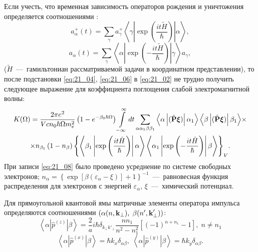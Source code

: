 Если учесть, что временная зависимость операторов рождения и уничтожения определяется соотношениями \cite{Khamidullin2002}:
\begin{equation} \label{eq:21_04}
a_{\alpha}^+ (t) = \sum_{\gamma}{a_{\gamma}^+ \left\langle \gamma \left| \exp{\left( \frac{it\widetilde{H}}{\hbar}\right) } \right| \alpha \right\rangle},
\end{equation}
\begin{equation} \label{eq:21_06}
a_{\alpha} (t) = \sum_{\gamma}{\left\langle \alpha \left| \exp{\left(- \frac{it\widetilde{H}}{\hbar}\right) } \right| \gamma \right\rangle a_{\gamma}},
\end{equation}  
($\widetilde{H}$~---~гамильтониан рассматриваемой задачи в координатном представлении), то после подстановки \eqref{eq:21_04}, \eqref{eq:21_06} в \eqref{eq:21_02} не трудно получить следующее выражение для коэффициента поглощения слабой электромагнитной волны: 
\begin{multline} \label{eq:21_08}
K(\Omega) = \frac{2 \pi e^2 }{V c n_0 \hbar \Omega m_e^2}\left( 1 - e^{-\beta_0 \hbar \Omega} \right) \int\limits_{-\infty }^{\infty} {dt \sum_{\alpha \alpha_1 \beta \beta_1} {\left\langle \alpha \left| (\hat{\boldsymbol{\mathbf{P}}} \boldsymbol{\mathbf{\xi}})  \right| \alpha_1 \right\rangle \left\langle \beta \left| (\hat{\boldsymbol{\mathbf{P}}} \boldsymbol{\mathbf{\xi}})  \right| \beta_1 \right\rangle}} \times\\
\times n_{\beta_1} \left(1-n_{\beta} \right)
{\left\lbrace  \left\langle \beta_1 \left| \exp \left(\frac{it\hat{H}}{\hbar}\right) \right|\alpha\right\rangle \left\langle \alpha_1 \left| \exp \left(-\frac{it\hat{H}}{\hbar}\right) \right|\beta\right\rangle \right\rbrace }_V  .
\end{multline} 
При записи \eqref{eq:21_08} было проведено усреднение по системе свободных электронов; $n_\alpha = \left\{ {\exp\left[ {\beta \left( {\varepsilon _\alpha - \xi } \right)} \right] + 1} \right\}^{ - 1}$~---~равновесная
функция распределения для электронов с энергией $\varepsilon{_\alpha}$, $\xi $~---~химический потенциал.

Для прямоугольной квантовой ямы матричные элементы оператора импульса определяются соотношениями $(\alpha (n, \boldsymbol{\mathbf{k}}{_\bot}), \; \beta (n', \boldsymbol{\mathbf{k}}'_{\bot}))$:
\begin{equation} \label{eq:21_09_01}
\left\langle \alpha \left| \hat{p}^{(z)} \right| \beta \right\rangle = \frac{2}{a} i\hbar \delta_{k_\bot k'_\bot} \frac{n n_1}{n^2 - n_1^2} \left[(-1)^{n+n_1} -1 \right] , \; n \neq n_1
\end{equation}
\begin{equation} \label{eq:21_09_02}
\left\langle \alpha \left| \hat{p}^{(x)} \right| \beta \right\rangle = \hbar k_x \delta_{\alpha\beta},\;
\left\langle \alpha \left| \hat{p}^{(y)} \right| \beta \right\rangle = \hbar k_y \delta_{\alpha\beta}.
\end{equation} 

